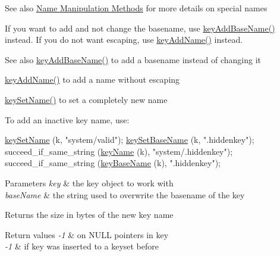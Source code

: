 \begin{DoxySeeAlso}{See also}
\hyperlink{group__keyname}{Name Manipulation Methods} for more details on special names
\end{DoxySeeAlso}
If you want to add and not change the basename, use \hyperlink{group__keyname_gaa942091fc4bd5c2699e49ddc50829524}{key\+Add\+Base\+Name()} instead. If you do not want escaping, use \hyperlink{group__keyname_gaa70593a2c772c4b7bc33423b9b10a270}{key\+Add\+Name()} instead.

\begin{DoxySeeAlso}{See also}
\hyperlink{group__keyname_gaa942091fc4bd5c2699e49ddc50829524}{key\+Add\+Base\+Name()} to add a basename instead of changing it 

\hyperlink{group__keyname_gaa70593a2c772c4b7bc33423b9b10a270}{key\+Add\+Name()} to add a name without escaping 

\hyperlink{group__keyname_ga7699091610e7f3f43d2949514a4b35d9}{key\+Set\+Name()} to set a completely new name
\end{DoxySeeAlso}
To add an inactive key name, use\+: 
\begin{DoxyCodeInclude}
        \hyperlink{group__keyname_ga7699091610e7f3f43d2949514a4b35d9}{keySetName} (k, \textcolor{stringliteral}{"system/valid"});
        \hyperlink{group__keyname_ga6e804bd453f98c28b0ff51430d1df407}{keySetBaseName} (k, \textcolor{stringliteral}{".hiddenkey"});
        succeed\_if\_same\_string (\hyperlink{group__keyname_ga8e805c726a60da921d3736cda7813513}{keyName} (k), \textcolor{stringliteral}{"system/.hiddenkey"});
        succeed\_if\_same\_string (\hyperlink{group__keyname_gaaff35e7ca8af5560c47e662ceb9465f5}{keyBaseName} (k), \textcolor{stringliteral}{".hiddenkey"});
\end{DoxyCodeInclude}
 
\begin{DoxyParams}{Parameters}
{\em key} & the key object to work with \\
\hline
{\em base\+Name} & the string used to overwrite the basename of the key \\
\hline
\end{DoxyParams}
\begin{DoxyReturn}{Returns}
the size in bytes of the new key name 
\end{DoxyReturn}

\begin{DoxyRetVals}{Return values}
{\em -\/1} & on N\+U\+LL pointers in key \\
\hline
{\em -\/1} & if key was inserted to a keyset before \\
\hline
\end{DoxyRetVals}
\mbox{\label{group__keyname_ga7699091610e7f3f43d2949514a4b35d9}} 
